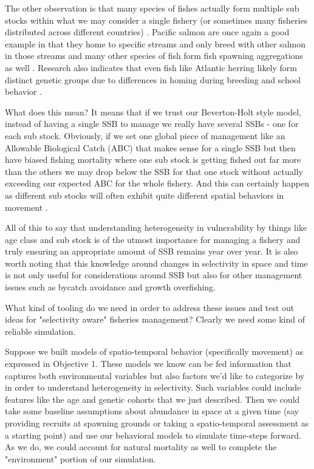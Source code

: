 \documentclass[11pt]{article}
\begin{document}
The other observation is that many species of fishes actually form multiple sub stocks within what we may consider a single fishery (or sometimes many fisheries distributed across different countries) \citep{lorenzen2010} \citep{salmonplan} \citep{prince2010}. Pacific salmon are once again a good example in that they home to specific streams and only breed with other salmon in those streams and many other species of fish form fish spawning aggregations as well \citep{erisman2017}. Research also indicates that even fish like Atlantic herring likely form distinct genetic groups due to differences in homing during breeding and school behavior \citep{armstrong2001}. 

What does this mean? It means that if we trust our Beverton-Holt style model, instead of having a single SSB to manage we really have several SSBs - one for each sub stock. Obviously, if we set one global piece of management like an Allowable Biological Catch (ABC) that makes sense for a single SSB but then have biased fishing mortality where one sub stock is getting fished out far more than the others we may drop below the SSB for that one stock without actually exceeding our expected ABC for the whole fishery. And this can certainly happen as different sub stocks will often exhibit quite different spatial behaviors in movement \citep{tucker2019} \citep{punt2019} \citep{cadrin2020}. \newline

All of this to say that understanding heterogeneity in vulnerability by things like age class and sub stock is of the utmost importance for managing a fishery and truly ensuring an appropriate amount of SSB remains year over year. It is also worth noting that this knowledge around changes in selectivity in space and time is not only useful for considerations around SSB but also for other management issues such as bycatch avoidance and growth overfishing. 

What kind of tooling do we need in order to address these issues and test out ideas for "selectivity aware" fisheries management? Clearly we need some kind of reliable simulation. \newline

Suppose we built models of spatio-temporal behavior (specifically movement) as expressed in Objective 1. These models we know can be fed information that captures both environmental variables but also factors we'd like to categorize by in order to understand heterogeneity in selectivity. Such variables could include features like the age and genetic cohorts that we just described. Then we could take some baseline assumptions about abundance in space at a given time (say providing recruits at spawning grounds or taking a spatio-temporal assessment as a starting point) and use our behavioral models to simulate time-steps forward. As we do, we could account for natural mortality as well to complete the "environment" portion of our simulation. 
\end{document}
